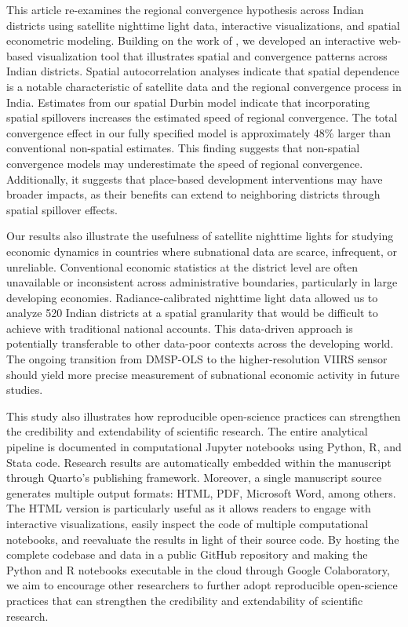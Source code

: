 \documentclass[
  a4paper, 
  twoside,
  review
]{article}
\newcounter{code}
\begin{document}
This article re-examines the regional convergence hypothesis across
Indian districts using satellite nighttime light data, interactive
visualizations, and spatial econometric modeling. Building on the work
of \citet{chanda_kabiraj_district_convergence}, we developed an
interactive web-based visualization tool that illustrates spatial and
convergence patterns across Indian districts. Spatial autocorrelation
analyses indicate that spatial dependence is a notable characteristic of
satellite data and the regional convergence process in India. Estimates
from our spatial Durbin model indicate that incorporating spatial
spillovers increases the estimated speed of regional convergence. The
total convergence effect in our fully specified model is approximately
48\% larger than conventional non-spatial estimates. This finding
suggests that non-spatial convergence models may underestimate the speed
of regional convergence. Additionally, it suggests that place-based
development interventions may have broader impacts, as their benefits
can extend to neighboring districts through spatial spillover effects.

Our results also illustrate the usefulness of satellite nighttime lights
for studying economic dynamics in countries where subnational data are
scarce, infrequent, or unreliable. Conventional economic statistics at
the district level are often unavailable or inconsistent across
administrative boundaries, particularly in large developing economies.
Radiance-calibrated nighttime light data allowed us to analyze 520
Indian districts at a spatial granularity that would be difficult to
achieve with traditional national accounts. This data-driven approach is
potentially transferable to other data-poor contexts across the
developing world. The ongoing transition from DMSP-OLS to the
higher-resolution VIIRS sensor should yield more precise measurement of
subnational economic activity in future studies.

This study also illustrates how reproducible open-science practices can
strengthen the credibility and extendability of scientific research. The
entire analytical pipeline is documented in computational Jupyter
notebooks using Python, R, and Stata code. Research results are
automatically embedded within the manuscript through Quarto's publishing
framework. Moreover, a single manuscript source generates multiple
output formats: HTML, PDF, Microsoft Word, among others. The HTML
version is particularly useful as it allows readers to engage with
interactive visualizations, easily inspect the code of multiple
computational notebooks, and reevaluate the results in light of their
source code. By hosting the complete codebase and data in a public
GitHub repository and making the Python and R notebooks executable in
the cloud through Google Colaboratory, we aim to encourage other
researchers to further adopt reproducible open-science practices that
can strengthen the credibility and extendability of scientific research.
\end{document}
